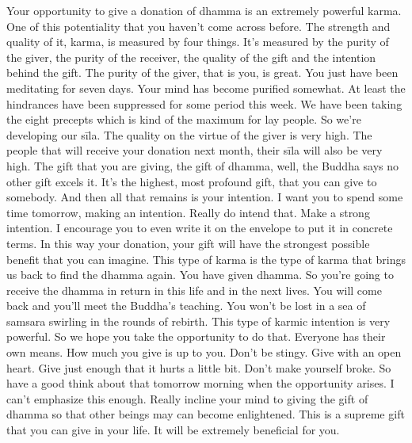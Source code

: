\documentclass[letterpaper,10pt,english]{sphinxmanual}
\begin{document}
\sphinxAtStartPar
{}  Your opportunity to give a donation of dhamma is an extremely powerful karma. One of this potentiality that you haven’t come across before. The
strength and quality of it, karma, is measured by four things. It’s measured
by the purity of the giver, the purity of the receiver, the quality of the gift
and  the  intention  behind  the  gift.  The  purity  of  the  giver,  that  is  you,  is
great. You just have been meditating for seven days. Your mind has become
purified somewhat. At least the hindrances have been suppressed for some
period this week. We have been taking the eight precepts which is kind of the
maximum for lay people. So we’re developing our sīla. The quality on the
virtue of the giver is very high. The people that will receive your donation
next month, their sīla will also be very high. The gift that you are giving, the
gift of dhamma, well, the Buddha says no other gift excels it. It’s the highest,  most  profound  gift,  that  you  can  give  to  somebody. And  then  all  that
remains is your intention. I want you to spend some time tomorrow, making
an intention.
Really do intend that. Make a strong
intention. I encourage you to even write it on the envelope to put it in concrete terms. In this way your donation, your gift will have the strongest possible benefit that you can imagine. This type of karma is the type of karma
that brings us back to find the dhamma again. You have given dhamma. So
you’re going to receive the dhamma in return in this life and in the next lives.
You will come back and you’ll meet the Buddha’s teaching. You won’t be
lost in a sea of samsara swirling in the rounds of rebirth. This type of karmic
intention is very powerful. So we hope you take the opportunity to do that.
Everyone  has  their  own  means.  How  much  you  give  is  up  to  you.  Don’t
be  stingy.  Give  with  an  open  heart.  Give  just  enough  that  it  hurts  a  little
bit. Don’t make yourself broke. So have a good think about that tomorrow
morning when the opportunity arises. I can’t emphasize this enough. Really
incline your mind to giving the gift of dhamma so that other beings may can
become enlightened. This is a supreme gift that you can give in your life. It
will be extremely beneficial for you.

\sphinxstepscope
\end{document}
